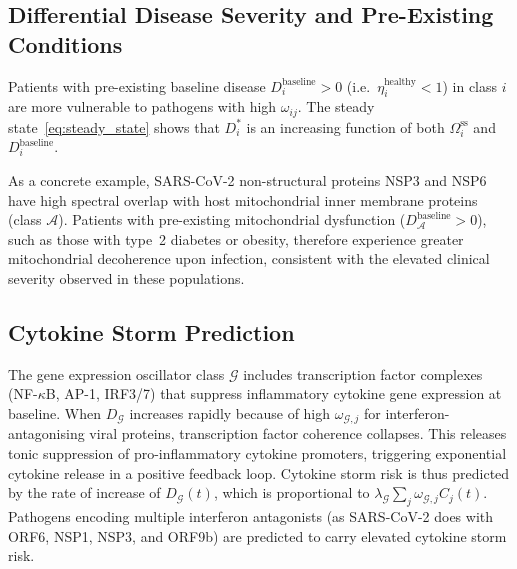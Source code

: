 \documentclass[twocolumn,11pt,a4paper]{article}
\theoremstyle{definition}
\theoremstyle{remark}
\begin{document}
\subsection{Differential Disease Severity and Pre-Existing Conditions}

Patients with pre-existing baseline disease $D_i^{\text{baseline}} > 0$ (i.e.\
$\eta_i^{\text{healthy}} < 1$) in class $i$ are more vulnerable to pathogens
with high $\omega_{ij}$. The steady state~\eqref{eq:steady_state} shows that
$D_i^*$ is an increasing function of both $\Omega_i^{\text{ss}}$ and
$D_i^{\text{baseline}}$.

As a concrete example, SARS-CoV-2 non-structural proteins NSP3 and NSP6 have
high spectral overlap with host mitochondrial inner membrane proteins (class
$\mathcal{A}$). Patients with pre-existing mitochondrial dysfunction
($D_\mathcal{A}^{\text{baseline}} > 0$), such as those with type~2 diabetes or
obesity, therefore experience greater mitochondrial decoherence upon infection,
consistent with the elevated clinical severity observed in these populations.

\subsection{Cytokine Storm Prediction}

The gene expression oscillator class $\mathcal{G}$ includes transcription factor
complexes (NF-$\kappa$B, AP-1, IRF3/7) that suppress inflammatory cytokine gene
expression at baseline. When $D_\mathcal{G}$ increases rapidly because of high
$\omega_{\mathcal{G},j}$ for interferon-antagonising viral proteins, transcription
factor coherence collapses. This releases tonic suppression of pro-inflammatory
cytokine promoters, triggering exponential cytokine release in a positive
feedback loop. Cytokine storm risk is thus predicted by the rate of increase of
$D_\mathcal{G}(t)$, which is proportional to $\lambda_\mathcal{G} \sum_j
\omega_{\mathcal{G},j} C_j(t)$. Pathogens encoding multiple interferon
antagonists (as SARS-CoV-2 does with ORF6, NSP1, NSP3, and ORF9b) are
predicted to carry elevated cytokine storm risk.
\end{document}
